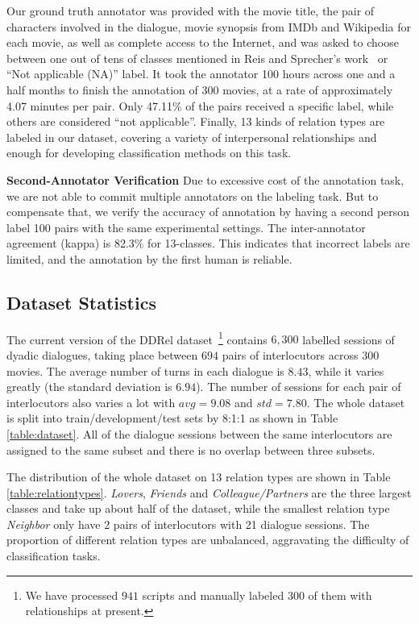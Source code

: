 \documentclass[letterpaper]{article} \usepackage{aaai21}  \usepackage{times}  \usepackage{helvet} \usepackage{courier}  \usepackage[hyphens]{url}  \usepackage{graphicx} \usepackage{xcolor}
\begin{document}
Our ground truth annotator was provided with the movie title, the pair of characters involved in the dialogue, movie synopsis from IMDb and Wikipedia for each movie, as well as complete access to the Internet, and was asked to choose between one out of tens of classes mentioned in Reis and Sprecher's work~\cite{reis2009encyclopedia} or ``Not applicable (NA)'' label.
It took the annotator 100 hours across one and a half months to finish the annotation of 300 movies, at a rate of approximately 4.07 minutes per pair. Only 47.11\% of the pairs received a specific label, while others are considered ``not applicable''. Finally, 13 kinds of relation types are labeled in our dataset, covering a variety of interpersonal relationships and enough for developing classification methods on this task.

\textbf{Second-Annotator Verification}
Due to excessive cost of the annotation task, we are not able to commit multiple annotators on the labeling task. But to compensate that, we verify the accuracy of annotation by having a second person label 100 pairs with the same experimental settings. The inter-annotator agreement (kappa) is 82.3\% for 13-classes. This indicates that incorrect labels are limited, and the annotation by the first human is reliable.




\subsection{Dataset Statistics}
The current version of the DDRel dataset~\footnote{We have processed $941$ scripts and 
	manually labeled $300$ of them with relationships at present.}
contains $6,300$ labelled sessions of dyadic dialogues, taking place between $694$ pairs of interlocutors across $300$ movies. 
The average number of turns in each dialogue is $8.43$, 
while it varies greatly (the standard deviation is $6.94$).  The number of sessions for each pair of interlocutors also varies a lot with $avg=9.08$ and $std=7.80$. The whole dataset is split into train/development/test sets by 8:1:1 as shown in Table \ref{table:dataset}. All of the dialogue sessions between the same interlocutors are assigned to the same subset and there is no overlap between three subsets. 


The distribution of the whole dataset on 13 relation types are shown in Table \ref{table:relationtypes}. {\em Lovers}, {\em Friends} and {\em Colleague/Partners} are the three largest classes and take up about half of the dataset, while the smallest relation type {\em Neighbor} only have 2 pairs of interlocutors with 21 dialogue sessions. The proportion of different relation types are unbalanced, aggravating the difficulty of classification tasks.
\end{document}
